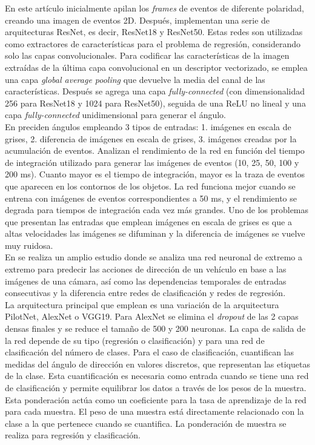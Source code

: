 En este artículo inicialmente apilan los \textit{frames} de eventos de diferente polaridad, creando una imagen de eventos 2D. Después, implementan una serie de arquitecturas ResNet, es decir, ResNet18 y ResNet50. Estas redes son utilizadas como extractores de características para el problema de regresión, considerando solo las capas convolucionales. Para codificar las características de la imagen extraídas de la última capa convolucional en un descriptor vectorizado, se emplea una capa \textit{global average pooling} que devuelve la media del canal de las características. Después se agrega una capa \textit{fully-connected} (con dimensionalidad 256 para ResNet18 y 1024 para ResNet50), seguida de una ReLU no lineal y una capa \textit{fully-connected} unidimensional para generar el ángulo.\\

En \cite{event} preciden ángulos empleando 3 tipos de entradas: 1. imágenes en escala de grises, 2. diferencia de imágenes en escala de grises, 3. imágenes creadas por la acumulación de eventos. Analizan el rendimiento de la red en función del tiempo de integración utilizado para generar las imágenes de eventos (10, 25, 50, 100 y 200 ms). Cuanto mayor es el tiempo de integración, mayor es la traza de eventos que aparecen en los contornos de los objetos. La red funciona mejor cuando se entrena con imágenes de eventos correspondientes a 50 ms, y el rendimiento se degrada para tiempos de integración cada vez más grandes. Uno de los problemas que presentan las entradas que emplean imágenes en escala de grises es que a altas velocidades las imágenes se difuminan y la diferencia de imágenes se vuelve muy ruidosa.\\

En \cite{pixels} se realiza un amplio estudio donde se analiza una red neuronal de extremo a extremo para predecir las acciones de dirección de un vehículo en base a las imágenes de una cámara, así como las dependencias temporales de entradas consecutivas y la diferencia entre redes de clasificación y redes de regresión.\\

La arquitectura principal que emplean es una variación de la arquitectura PilotNet, AlexNet o VGG19. Para AlexNet se elimina el \textit{dropout} de las 2 capas densas finales y se reduce el tamaño de 500 y 200 neuronas. La capa de salida de la red depende de su tipo (regresión o clasificación) y para una red de clasificación del número de clases. Para el caso de clasificación, cuantifican las medidas del ángulo de dirección en valores discretos, que representan las etiquetas de la clase. Esta cuantificación es necesaria como entrada cuando se tiene una red de clasificación y permite equilibrar los datos a través de los pesos de la muestra. Esta ponderación actúa como un coeficiente para la tasa de aprendizaje de la red para cada muestra. El peso de una muestra está directamente relacionado con la clase a la que pertenece cuando se cuantifica. La ponderación de muestra se realiza para regresión y clasificación.\\

